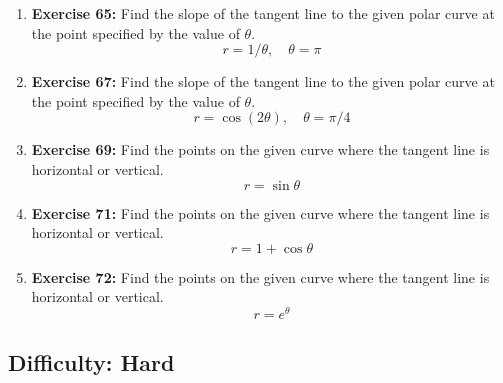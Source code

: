 \begin{enumerate}
    \item \textbf{Exercise 65:} Find the slope of the tangent line to the given polar curve at the point specified by the value of $\theta$.
    \[ r = 1/\theta, \quad \theta = \pi \]

    \item \textbf{Exercise 67:} Find the slope of the tangent line to the given polar curve at the point specified by the value of $\theta$.
    \[ r = \cos(2\theta), \quad \theta = \pi/4 \]

    \item \textbf{Exercise 69:} Find the points on the given curve where the tangent line is horizontal or vertical.
    \[ r = \sin\theta \]

    \item \textbf{Exercise 71:} Find the points on the given curve where the tangent line is horizontal or vertical.
    \[ r = 1 + \cos\theta \]
    
    \item \textbf{Exercise 72:} Find the points on the given curve where the tangent line is horizontal or vertical.
    \[ r = e^\theta \]
\end{enumerate}

\hrulefill
\vspace{1em}

\subsection*{Difficulty: Hard}


